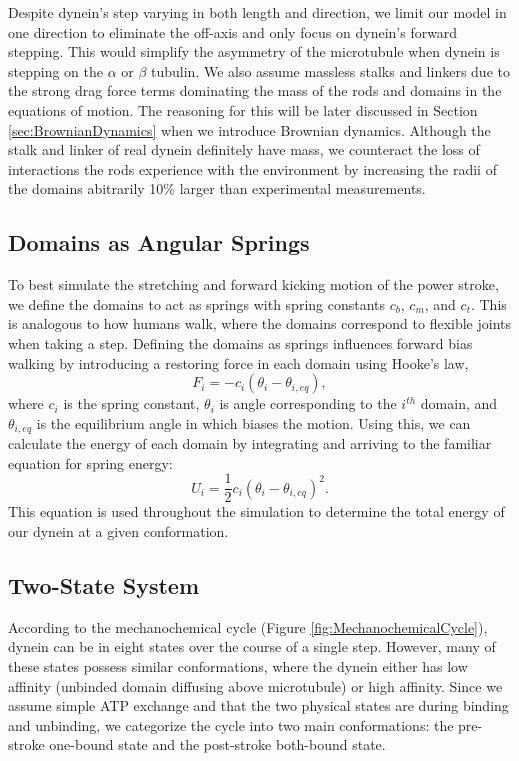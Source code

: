 Despite dynein's step varying in both length and direction, we limit our model in one direction to eliminate the off-axis and only focus on dynein's forward stepping. This would simplify the asymmetry of the microtubule when dynein is stepping on the $\alpha$ or $\beta$ tubulin. We also assume massless stalks and linkers due to the strong drag force terms dominating the mass of the rods and domains in the equations of motion. The reasoning for this will be later discussed in Section \ref{sec:BrownianDynamics} when we introduce Brownian dynamics. Although the stalk and linker of real dynein definitely have mass, we counteract the loss of interactions the rods experience with the environment by increasing the radii of the domains abitrarily 10\% larger than experimental measurements.

\subsection{Domains as Angular Springs}
To best simulate the stretching and forward kicking motion of the power stroke, we define the domains to act as springs with spring constants $c_b$, $c_m$, and $c_t$. This is analogous to how humans walk, where the domains correspond to flexible joints when taking a step. Defining the domains as springs influences forward bias walking by introducing a restoring force in each domain using Hooke's law, 
\begin{equation}
    F_i=-c_i(\theta_i-\theta_{i,eq}),
\end{equation}
where $c_i$ is the spring constant, $\theta_i$ is angle corresponding to the $i^{th}$ domain, and $\theta_{i,eq}$ is the equilibrium angle in which biases the motion. Using this, we can calculate the energy of each domain by integrating and arriving to the familiar equation for spring energy:
\begin{equation} \label{eqn:energy}
    U_i=\frac{1}{2}c_i(\theta_i-\theta_{i,eq})^2.
\end{equation}
This equation is used throughout the simulation to determine the total energy of our dynein at a given conformation. 


\subsection{Two-State System}
According to the mechanochemical cycle (Figure \ref{fig:MechanochemicalCycle}), dynein can be in eight states over the course of a single step. However, many of these states possess similar conformations, where the dynein either has low affinity (unbinded domain diffusing above microtubule) or high affinity. Since we assume simple ATP exchange and that the two physical states are during binding and unbinding, we categorize the cycle into two main conformations: the pre-stroke one-bound state and the post-stroke both-bound state.

